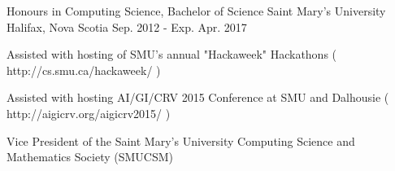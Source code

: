 

\begin{cventries}

  \cventry
    {Honours in Computing Science, Bachelor of Science} %
    {Saint Mary's University} %
    {Halifax, Nova Scotia} %
    {Sep. 2012 - Exp. Apr. 2017} %
    {
      \begin{cvitems} %
        \item {Assisted with hosting of SMU's annual "Hackaweek" Hackathons ( http://cs.smu.ca/hackaweek/ ) }
	\item {Assisted with hosting AI/GI/CRV 2015 Conference at SMU and Dalhousie ( http://aigicrv.org/aigicrv2015/ ) }
	\item {Vice President of the Saint Mary's University Computing Science and Mathematics Society (SMUCSM) }
      \end{cvitems}
    }

\end{cventries}
